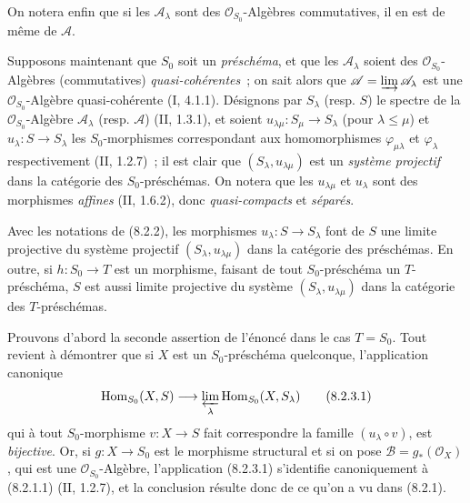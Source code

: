 \begin{env}[8.2.1]
On notera enfin que si les $\mathscr A_\lambda$ sont des
$\mathcal O_{S_0}$-Algèbres commutatives, il en est de même de $\mathscr A$.
\end{env}

\begin{env}[8.2.2]
\label{IV.8.2.2-fr}
Supposons maintenant que $S_0$ soit un \emph{préschéma}, et que les
$\mathscr A_\lambda$ soient des $\mathcal O_{S_0}$-Algèbres (commutatives)
\emph{quasi-cohérentes}~; on sait alors que
$\mathscr A=\varinjlim\mathscr A_\lambda$ est une
$\mathcal O_{S_0}$-Algèbre quasi-cohérente (I, 4.1.1). Désignons par
$S_\lambda$ (resp. $S$) le spectre de la $\mathcal O_{S_0}$-Algèbre
$\mathscr A_\lambda$ (resp. $\mathscr A$) (II, 1.3.1), et soient
$u_{\lambda\mu}:S_\mu\to S_\lambda$ (pour $\lambda\leq\mu$) et
$u_\lambda:S\to S_\lambda$ les $S_0$-morphismes correspondant aux
homomorphismes $\varphi_{\mu\lambda}$ et $\varphi_\lambda$ respectivement
(II, 1.2.7)~; il est clair que $(S_\lambda,u_{\lambda\mu})$ est un
\emph{système projectif} dans la catégorie des $S_0$-préschémas. On notera
que les $u_{\lambda\mu}$ et $u_\lambda$ sont des morphismes \emph{affines}
(II, 1.6.2), donc \emph{quasi-compacts} et \emph{séparés}.
\end{env}

\begin{proposition}[8.2.3]
\label{IV.8.2.3-fr}
Avec les notations de (8.2.2), les morphismes $u_\lambda:S\to S_\lambda$
font de $S$ une limite projective du système projectif
$(S_\lambda,u_{\lambda\mu})$ dans la catégorie des préschémas. En outre, si
$h:S_0\to T$ est un morphisme, faisant de tout $S_0$-préschéma un
$T$-préschéma, $S$ est aussi limite projective du système
$(S_\lambda,u_{\lambda\mu})$ dans la catégorie des $T$-préschémas.
\end{proposition}

Prouvons d'abord la seconde assertion de l'énoncé dans le cas $T=S_0$.
Tout revient à démontrer que si $X$ est un $S_0$-préschéma quelconque,
l'application canonique
\begin{equation}
\operatorname{Hom}_{S_0}(X,S)\longrightarrow
\varprojlim_\lambda\operatorname{Hom}_{S_0}(X,S_\lambda)
\tag{8.2.3.1}\label{IV.8.2.3.1-fr}
\end{equation}
qui à tout $S_0$-morphisme $v:X\to S$ fait correspondre la famille
$(u_\lambda\circ v)$, est \emph{bijective}. Or, si $g:X\to S_0$ est le
morphisme structural et si on pose $\mathscr B=g_*(\mathcal O_X)$, qui est
une $\mathcal O_{S_0}$-Algèbre, l'application (8.2.3.1) s'identifie
canoniquement à (8.2.1.1) (II, 1.2.7), et la conclusion résulte donc de ce
qu'on a vu dans (8.2.1).

